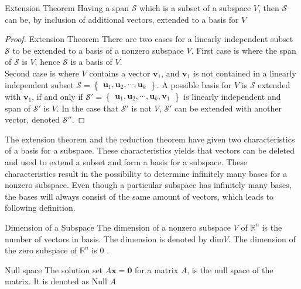 \begin{theorem}{Extension Theorem}
Having a span $\mathcal{S}$ which is a subset of a subspace $V$, then $\mathcal{S}$ can be, by inclusion of additional vectors, extended to a basis for $V$
\end{theorem}

\begin{proof}{Extension Theorem}
There are two cases for a linearly independent subset $\mathcal{S}$ to be extended to a basis of a nonzero subspace $V$.
First case is where the span of $\mathcal{S}$ is $V$, hence $\mathcal{S}$ is a basis of $V$.\\
Second case is where $V$ contains a vector $\textbf{v}_1$, and $\textbf{v}_1$ is not contained in a linearly independent subset $\mathcal{S}=
\begin{Bmatrix} \textbf{u}_1,\textbf{u}_2,\cdots,\textbf{u}_k \end{Bmatrix} 
 $. A possible basis for $V$ is $\mathcal{S}$ extended with $\textbf{v}_1$, if and only if $\mathcal{S'}=\begin{Bmatrix} \textbf{u}_1,\textbf{u}_2,\cdots,\textbf{u}_k, \textbf{v}_1 \end{Bmatrix}$ is linearly independent and span of $\mathcal{S'}$ is $V$. In the case that $\mathcal{S'}$ is not $V$, $\mathcal{S'}$ can be extended with another vector, denoted $\mathcal{S''}$. \qedsymbol 
\end{proof}

The extension theorem and the reduction theorem have given two characteristics of a basis for a subspace. These characteristics yields that vectors can be deleted and used to extend a subset and form a basis for a subspace. These characteristics result in the possibility to determine infinitely many bases for a nonzero subspace. Even though a particular subspace has infinitely many bases, the bases will always consist of the same amount of vectors, which leads to following definition.

\begin{definition}{Dimension of a Subspace}
The dimension of a nonzero subspace $V$ of $\mathbb{R}^n$ is the number of vectors in  basis. The dimension is denoted by dim$V$. The dimension of the zero subspace of $\mathbb{R}^n$ is 0 \cite[246]{LiAl}.
\end{definition}

\begin{definition}{Null space}
The solution set $A\textbf{x}=\textbf{0}$ for a matrix $A$, is the null space of the matrix. It is denoted as Null $A$
\end{definition}

